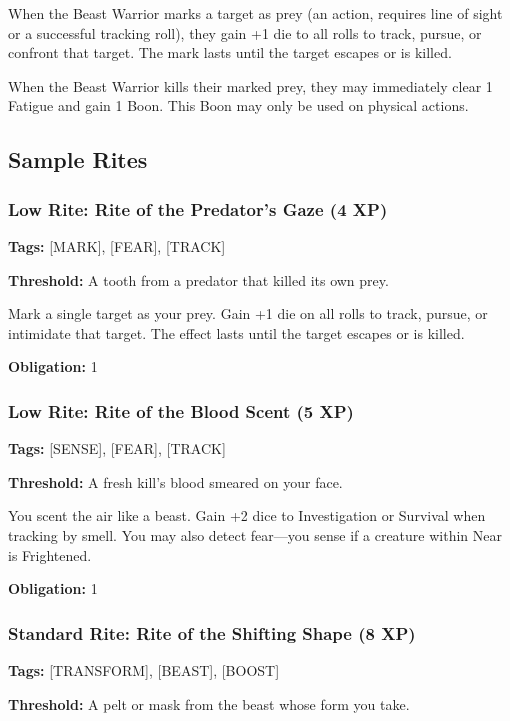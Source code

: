 When the Beast Warrior marks a target as prey (an action, requires line of sight or a successful tracking roll), they gain +1 die to all rolls to track, pursue, or confront that target. The mark lasts until the target escapes or is killed.

When the Beast Warrior kills their marked prey, they may immediately clear 1 Fatigue and gain 1 Boon. This Boon may only be used on physical actions.

\subsection{Sample Rites}

\subsubsection{Low Rite: Rite of the Predator's Gaze (4 XP)}

\textbf{Tags:} [MARK], [FEAR], [TRACK]

\textbf{Threshold:} A tooth from a predator that killed its own prey.

Mark a single target as your prey. Gain +1 die on all rolls to track, pursue, or intimidate that target. The effect lasts until the target escapes or is killed.

\textbf{Obligation:} 1

\subsubsection{Low Rite: Rite of the Blood Scent (5 XP)}

\textbf{Tags:} [SENSE], [FEAR], [TRACK]

\textbf{Threshold:} A fresh kill's blood smeared on your face.

You scent the air like a beast. Gain +2 dice to Investigation or Survival when tracking by smell. You may also detect fear—you sense if a creature within Near is Frightened.

\textbf{Obligation:} 1

\subsubsection{Standard Rite: Rite of the Shifting Shape (8 XP)}

\textbf{Tags:} [TRANSFORM], [BEAST], [BOOST]

\textbf{Threshold:} A pelt or mask from the beast whose form you take.

